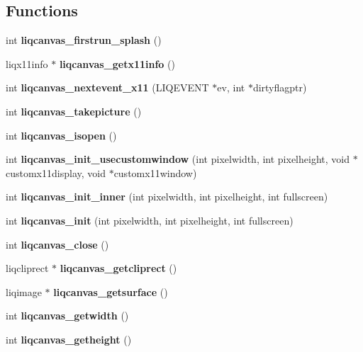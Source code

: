 \subsection*{Functions}
\begin{CompactItemize}
\item 
int {\bf liqcanvas\_\-firstrun\_\-splash} ()
\item 
liqx11info $\ast$ \textbf{liqcanvas\_\-getx11info} ()\label{d6/df5/liqcanvas_8c_889c4aafc0a5c9ef1244e347433adbf9}

\item 
int \textbf{liqcanvas\_\-nextevent\_\-x11} (LIQEVENT $\ast$ev, int $\ast$dirtyflagptr)\label{d6/df5/liqcanvas_8c_183c9a153aa2f21f92177c7d67192ddc}

\item 
int \textbf{liqcanvas\_\-takepicture} ()\label{d6/df5/liqcanvas_8c_19633692d4a14ee119467ab3388cbe79}

\item 
int \textbf{liqcanvas\_\-isopen} ()\label{d6/df5/liqcanvas_8c_54a87a6193a048be8c3fcb8eb3191ee8}

\item 
int \textbf{liqcanvas\_\-init\_\-usecustomwindow} (int pixelwidth, int pixelheight, void $\ast$customx11display, void $\ast$customx11window)\label{d6/df5/liqcanvas_8c_ec198fad80e117d72dac537f34e4fdae}

\item 
int {\bf liqcanvas\_\-init\_\-inner} (int pixelwidth, int pixelheight, int fullscreen)
\item 
int {\bf liqcanvas\_\-init} (int pixelwidth, int pixelheight, int fullscreen)
\item 
int \textbf{liqcanvas\_\-close} ()\label{d6/df5/liqcanvas_8c_cddb111ced293447feca07888077a6c3}

\item 
liqcliprect $\ast$ \textbf{liqcanvas\_\-getcliprect} ()\label{d6/df5/liqcanvas_8c_a96ecadc23930fef85d1163594ba0839}

\item 
liqimage $\ast$ \textbf{liqcanvas\_\-getsurface} ()\label{d6/df5/liqcanvas_8c_40f3a7976e1050d8033ee546776c27f3}

\item 
int \textbf{liqcanvas\_\-getwidth} ()\label{d6/df5/liqcanvas_8c_d0539c1ff094599a4727665a6ec5c5d0}

\item 
int \textbf{liqcanvas\_\-getheight} ()\label{d6/df5/liqcanvas_8c_ec8faa46f11d51d44f2c93ac67cdb949}


\end{CompactItemize}

